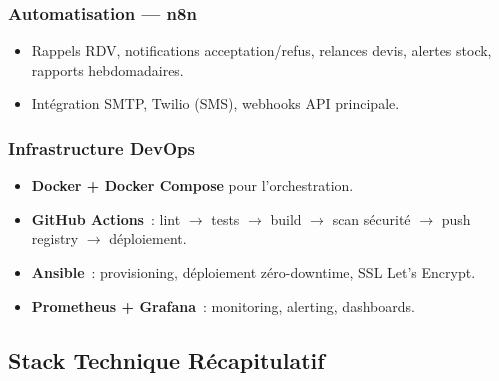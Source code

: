 \documentclass[12pt,a4paper]{report}
\begin{document}
\subsubsection{Automatisation --- n8n}
\begin{itemize}
  \item Rappels RDV, notifications acceptation/refus, relances devis,
    alertes stock, rapports hebdomadaires.
  \item Int\'{e}gration SMTP, Twilio (SMS), webhooks API principale.
\end{itemize}

\subsubsection{Infrastructure DevOps}
\begin{itemize}
  \item \textbf{Docker + Docker Compose} pour l'orchestration.
  \item \textbf{GitHub Actions}~: lint $\rightarrow$ tests
    $\rightarrow$ build $\rightarrow$ scan s\'{e}curit\'{e}
    $\rightarrow$ push registry $\rightarrow$ d\'{e}ploiement.
  \item \textbf{Ansible}~: provisioning, d\'{e}ploiement
    z\'{e}ro-downtime, SSL Let's Encrypt.
  \item \textbf{Prometheus + Grafana}~: monitoring, alerting,
    dashboards.
\end{itemize}

\subsection{Stack Technique R\'{e}capitulatif}
\end{document}
